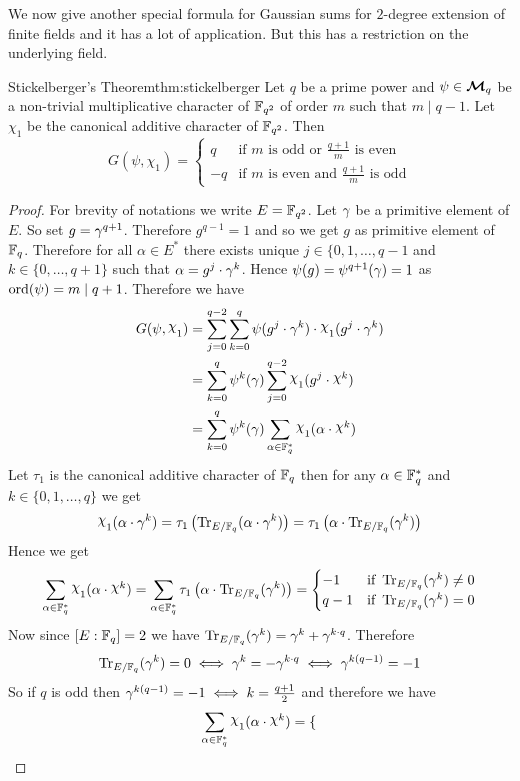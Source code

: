We now give another special formula for Gaussian sums for $2$-degree extension of finite fields and it  has a lot of application. But this has a restriction on the underlying field. 
\begin{Theorem}{Stickelberger's Theorem}{thm:stickelberger}%
  Let $q$ be a prime power and $\psi\in\Mq$ be a non-trivial multiplicative character of $\bbF_{q^2}$ of order $m$ such that $m\mid q-1$. Let $\chi_1$ be the canonical additive character of $\bbF_{q^2}$. Then $$G(\psi,\chi_1)=\begin{cases}
    q & \text{if $m$ is odd or $\frac{q+1}m$ is even}\\
    -q & \text{if $m$ is even and $\frac{q+1}m$ is odd}
  \end{cases}$$
\end{Theorem}
\begin{proof}
  For brevity of notations we write $E=\bbF_{q^2}$. Let $\gm$ be a primitive element of $E$. So set $g=\gm^{q+1}$. Therefore $g^{q-1}=1$ and so we get $g$ as primitive element of $\bbF_q$. Therefore for all $\alpha\in E^*$ there exists unique $j\in\{0,1,\dots,q-1$ and $k\in\{0,\dots, q+1\}$ such that $\alpha=g^j\cdot \gm^k$. Hence $\psi(g)=\psi^{q+1}(\gm)=1$ as $\ord(\psi)=m\mid q+1$. Therefore we have 
  \begin{align*}
    G(\psi,\chi_1) & = \sum_{j=0}^{q-2}\sum_{k=0}^{q}\psi(g^j\cdot \gm^k)\cdot \chi_1(g^j\cdot \gm^k)\\ 
    & = \sum_{k=0}^q\psi^k(\gm)\sum_{j=0}^{q-2}\chi_1(g^j\cdot \chi^k)\\ 
    & = \sum_{k=0}^q\psi^k(\gm)\sum_{\alpha\in\bbF_q^*}\chi_1(\alpha\cdot \chi^k)
  \end{align*} 
  Let $\tau_1$ is the canonical additive character of $\bbF_q$ then for any $\alpha\in\bbF_q^*$ and $k\in\{0,1,\dots,q\}$ we get $$\chi_1(\alpha\cdot \gm^k)=\tau_1\lt(\tr_{E/\bbF_q}(\alpha\cdot \gm^k)\rt)=\tau_1\lt(\alpha\cdot\tr_{E/\bbF_q}( \gm^k)\rt)$$Hence we get $$\sum_{\alpha\in\bbF_q^*}\chi_1(\alpha\cdot \chi^k)=\sum_{\alpha\in\bbF_q^*}\tau_1\lt(\alpha\cdot\tr_{E/\bbF_q}( \gm^k)\rt)=\begin{cases}
    -1 & \text{if }\tr_{E/\bbF_q}( \gm^k)\neq 0\\ 
    q-1 & \text{if }\tr_{E/\bbF_q}( \gm^k)=0
  \end{cases}$$Now since $[E:\bbF_q]=2$ we have $\tr_{E/\bbF_q}( \gm^k)=\gm^k+\gm^{k\cdot q}$. Therefore $$\tr_{E/\bbF_q}( \gm^k)=0\iff\gm^k=-\gm^{k\cdot q}\iff \gm^{k(q-1)}=-1$$So if $q$ is odd then $\gm^{k(q-1)}=-1\iff k=\frac{q+1}2$ and therefore we have $$\sum_{\alpha\in\bbF_q^*}\chi_1(\alpha\cdot \chi^k)=\begin{cases}

\end{cases}$$
\end{proof}
